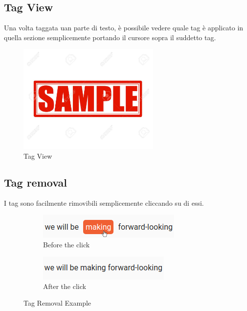 \documentclass[twoside]{supsistudent}
\begin{document}
\subsection{Tag View}

Una volta taggata uan parte di testo, è possibile vedere quale tag è applicato
in quella sezione semplicemente portando il cursore sopra il suddetto tag.

\begin{figure}[h!]
  \centering
  \includegraphics[width=7cm]{figures/sample.jpg}
  \caption{Tag View}
  \label{fig:tagView}
\end{figure}

\subsection{Tag removal}

I tag sono facilmente rimovibili semplicemente cliccando su di essi.

\begin{figure}[h!]
  \centering
  \begin{subfigure}[b]{0.4\linewidth}
    \includegraphics[width=\linewidth]{figures/tagRemoval1.png}
    \caption{Before the click}
  \end{subfigure}
  \begin{subfigure}[b]{0.4\linewidth}
    \includegraphics[width=\linewidth]{figures/tagRemoval2.png}
    \caption{After the click}
  \end{subfigure}
  \caption{Tag Removal Example}
  \label{fig:tagRemoval}
\end{figure}
\end{document}
